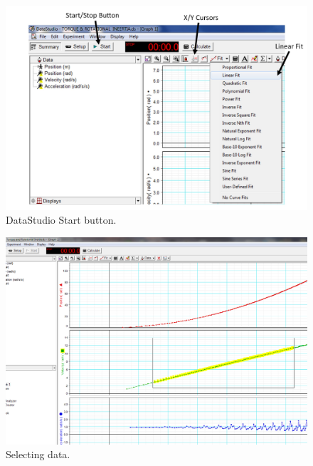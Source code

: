 \begin{figure}[h]
	\begin{center}
		\includegraphics[width=0.9\linewidth]{./Exp6/pic/screenshot1.jpg}
	\end{center}
	\caption{DataStudio Start button.}
	\label{fig:screenshot1}
\end{figure}
\begin{figure}[h]
	\begin{center}
		\includegraphics[width=0.9\linewidth]{./Exp6/pic/screenshot2.png}
	\end{center}
	\caption{Selecting data.}
	\label{fig:screenshot2}
\end{figure}
